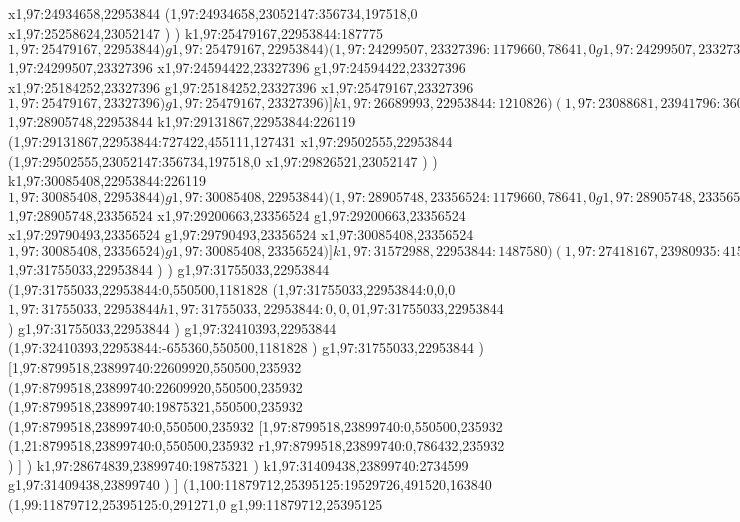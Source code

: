 {x1,97:24934658,22953844
(1,97:24934658,23052147:356734,197518,0
x1,97:25258624,23052147
)
)
k1,97:25479167,22953844:187775
$1,97:25479167,22953844
)
g1,97:25479167,22953844
)
(1,97:24299507,23327396:1179660,78641,0
g1,97:24299507,23327396
(1,97:24299507,23327396:1179660,78641,0
$1,97:24299507,23327396
x1,97:24594422,23327396
g1,97:24594422,23327396
x1,97:25184252,23327396
g1,97:25184252,23327396
x1,97:25479167,23327396
$1,97:25479167,23327396
)
g1,97:25479167,23327396
)
]
k1,97:26689993,22953844:1210826
)
(1,97:23088681,23941796:3601312,308566,89201
x1,97:23844169,23941796
x1,97:25404753,23941796
g1,97:25581337,23941796
x1,97:26689993,23941796
)
]
g1,97:26799217,22953844
x1,97:27308943,22953844
g1,97:27418167,22953844
[1,97:27418167,22953844:4154821,455111,1181828
(1,97:27418167,22953844:4154821,455111,599288
k1,97:28905748,22953844:1487581
[1,97:28905748,22953844:1179660,455111,599288
(1,97:28905748,22953844:1179660,455111,127431
g1,97:28905748,22953844
(1,97:28905748,22953844:1179660,455111,127431
$1,97:28905748,22953844
k1,97:29131867,22953844:226119
(1,97:29131867,22953844:727422,455111,127431
x1,97:29502555,22953844
(1,97:29502555,23052147:356734,197518,0
x1,97:29826521,23052147
)
)
k1,97:30085408,22953844:226119
$1,97:30085408,22953844
)
g1,97:30085408,22953844
)
(1,97:28905748,23356524:1179660,78641,0
g1,97:28905748,23356524
(1,97:28905748,23356524:1179660,78641,0
$1,97:28905748,23356524
x1,97:29200663,23356524
g1,97:29200663,23356524
x1,97:29790493,23356524
g1,97:29790493,23356524
x1,97:30085408,23356524
$1,97:30085408,23356524
)
g1,97:30085408,23356524
)
]
k1,97:31572988,22953844:1487580
)
(1,97:27418167,23980935:4154821,318577,89201
x1,97:29235526,23980935
g1,97:29412110,23980935
x1,97:31572988,23980935
)
]
x1,97:31755033,22953844
)
$1,97:31755033,22953844
)
)
g1,97:31755033,22953844
(1,97:31755033,22953844:0,550500,1181828
(1,97:31755033,22953844:0,0,0
$1,97:31755033,22953844
h1,97:31755033,22953844:0,0,0
$1,97:31755033,22953844
)
g1,97:31755033,22953844
)
g1,97:32410393,22953844
(1,97:32410393,22953844:-655360,550500,1181828
)
g1,97:31755033,22953844
)
[1,97:8799518,23899740:22609920,550500,235932
(1,97:8799518,23899740:22609920,550500,235932
(1,97:8799518,23899740:19875321,550500,235932
(1,97:8799518,23899740:0,550500,235932
[1,97:8799518,23899740:0,550500,235932
(1,21:8799518,23899740:0,550500,235932
r1,97:8799518,23899740:0,786432,235932
)
]
)
k1,97:28674839,23899740:19875321
)
k1,97:31409438,23899740:2734599
g1,97:31409438,23899740
)
]
(1,100:11879712,25395125:19529726,491520,163840
(1,99:11879712,25395125:0,291271,0
g1,99:11879712,25395125
}
